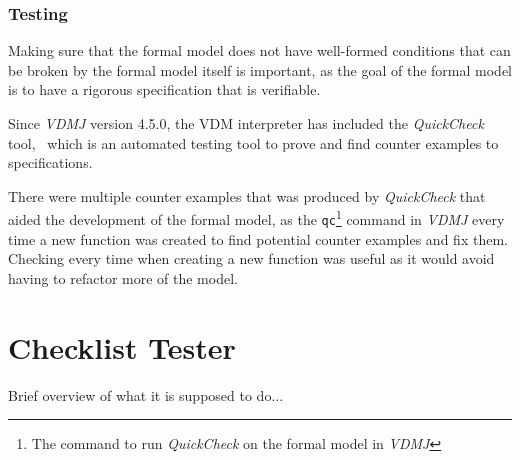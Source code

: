 \documentclass[../dissertation.tex]{subfiles}
\begin{document}
\subsubsection{Testing}

Making sure that the formal model does not have well-formed conditions that can
be broken by the formal model itself is important, as the goal of the formal model
is to have a rigorous specification that is verifiable.

Since \textit{VDMJ} version 4.5.0, the VDM interpreter has included the \textit{QuickCheck} tool,~\cite{vdmj:4.5.0}
which is an automated testing tool to prove and find counter examples to specifications.~\cite{quickcheck}

There were multiple counter examples that was produced by \textit{QuickCheck} that aided
the development of the formal model, as the \lstinline|qc|\footnote{The command to run \textit{QuickCheck} on the formal model in \textit{VDMJ}}
command in \textit{VDMJ} every time a new function was created to find potential counter
examples and fix them.
Checking every time when creating a new function was useful as it would avoid having to
refactor more of the model.


\section{Checklist Tester}
Brief overview of what it is supposed to do... %
\end{document}
